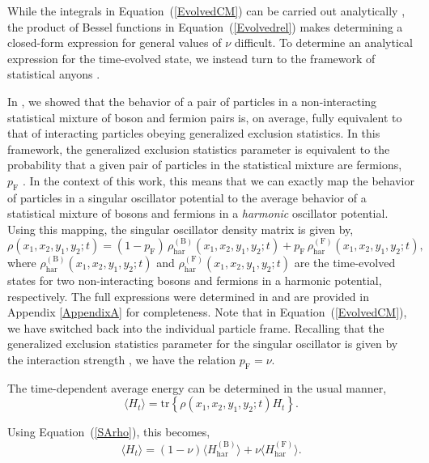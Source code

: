 \documentclass[preprints,article,accept,moreauthors,pdftex]{Definitions/mdpi}
\begin{document}
While the integrals in Equation~(\ref{EvolvedCM}) can be carried out analytically \cite{Deffner2008,Deffner2010CP,Deffner2013PRE}, the product of Bessel functions in Equation~(\ref{Evolvedrel}) makes determining a closed-form expression for general values of $\nu$ difficult. To determine an analytical expression for the time-evolved state, we instead turn to the framework of statistical anyons \cite{Myers2021}.

In \cite{Myers2021}, we showed that the behavior of a pair of particles in a non-interacting statistical mixture of boson and fermion pairs is, on average, fully equivalent to that of interacting particles obeying generalized exclusion statistics. In this framework, the generalized exclusion statistics parameter is equivalent to the probability that a given pair of particles in the statistical mixture are fermions, $p_{\mathrm{F}}$ \cite{Myers2021}. In the context of this work, this means that we can exactly map the behavior of particles in a singular oscillator potential to the average behavior of a statistical mixture of bosons and fermions in a \textit{harmonic} oscillator potential. Using this mapping, the singular oscillator density matrix is given by,
\begin{equation}
	\label{SArho}
	\rho(x_1,x_2,y_1,y_2;t) = (1-p_{\mathrm{F}}) \, \rho_{\mathrm{har}}^{(\mathrm{B})}(x_1,x_2,y_1,y_2;t) + p_{\mathrm{F}} \, \rho_{\mathrm{har}}^{(\mathrm{F})}(x_1,x_2,y_1,y_2;t),
\end{equation}
where $\rho_{\mathrm{har}}^{(\mathrm{B})}(x_1,x_2,y_1,y_2;t)$ and $\rho_{\mathrm{har}}^{(\mathrm{F})}(x_1,x_2,y_1,y_2;t)$ are the time-evolved states for two non-interacting bosons and fermions in a harmonic potential, respectively. The full expressions were determined in \cite{Myers2020} and are provided in Appendix \ref{AppendixA} for completeness. Note that in Equation~(\ref{EvolvedCM}), we have switched back into the individual particle frame. Recalling that the generalized exclusion statistics parameter for the singular oscillator is given by the interaction strength \cite{Murthy1994}, we have the relation $p_{\mathrm{F}} = \nu$. 

The time-dependent average energy can be determined in the usual manner,
\begin{equation}
	\langle H_t \rangle = \mathrm{tr}\left\{\rho(x_1,x_2,y_1,y_2;t)H_t \right\}. 
\end{equation}

Using Equation~(\ref{SArho}), this becomes,
\begin{equation}
	\label{HSA}
	\langle H_t \rangle = (1-\nu)\langle H_{\mathrm{har}}^{(\mathrm{B})} \rangle + \nu\langle H_{\mathrm{har}}^{(\mathrm{F})} \rangle. 
\end{equation}
\end{document}
